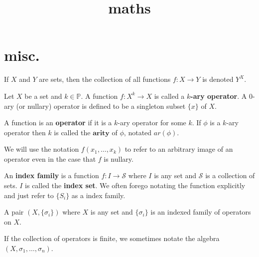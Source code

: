 

%


\title{maths}

\maketitle


\section{misc.}

\begin{definition}
\label{def-collection-all-functions}

If $X$ and $Y$ are sets, then the collection of all functions $f: X \rightarrow Y$ is denoted $Y^X$.

\end{definition}

\begin{definition}
\label{def-k-ary-operator}

Let $X$ be a set and $k \in \mathbb{P}$. A function $f: X^k \rightarrow X$ is called a \textbf{$k$-ary operator}. A $0$-ary (or nullary) operator is defined to be a singleton subset $\{x\}$ of $X$.

A function is an \textbf{operator} if it is a $k$-ary operator for some $k$. If $\phi$ is a $k$-ary operator then $k$ is called the $\textbf{arity}$ of $\phi$, notated $ar(\phi)$.

We will use the notation $f(x_1, \ldots, x_k)$ to refer to an arbitrary image of an operator even in the case that $f$ is nullary.

\end{definition}


\begin{definition}
\label{def-indexed-family}

An \textbf{index family} is a function $f: I \rightarrow \mathcal{S}$ where $I$ is any set and $\mathcal{S}$ is a collection of sets. $I$ is called the \textbf{index set}. We often forego notating the function explicitly and just refer to $\{S_i\}$ as a index family.

\end{definition}


\begin{definition}
\label{def-abstract-algebra}

A pair $(X, \{\sigma_i\})$ where $X$ is any set and $\{\sigma_i\}$ is an indexed family of operators on $X$.

If the collection of operators is finite, we sometimes notate the algebra $(X, \sigma_1, \ldots, \sigma_n)$.
    
\end{definition}


